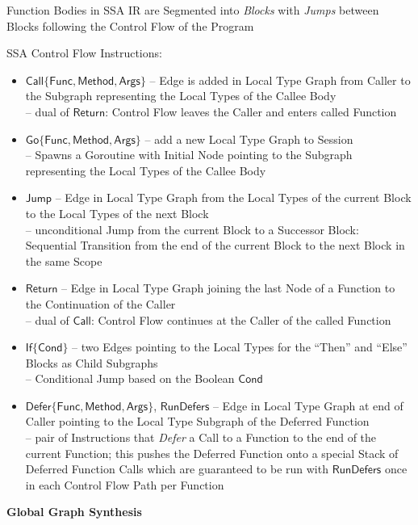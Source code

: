 Function Bodies in SSA IR are Segmented into \emph{Blocks} with
\emph{Jumps} between Blocks following the Control Flow of the Program

SSA Control Flow Instructions:
\begin{itemize}
  \item $\mathsf{Call\{Func, Method, Args\}}$ -- Edge is added in
    Local Type Graph from Caller to the Subgraph representing the
    Local Types of the Callee Body \\
    -- dual of $\mathsf{Return}$: Control Flow leaves the Caller and
    enters called Function
  \item $\mathsf{Go\{Func, Method, Args\}}$ -- add a new Local Type
    Graph to Session \\
    -- Spawns a Goroutine with Initial Node pointing to the Subgraph
    representing the Local Types of the Callee Body
  \item $\mathsf{Jump}$ -- Edge in Local Type Graph from the Local
    Types of the current Block to the Local Types of the next Block \\
    -- unconditional Jump from the current Block to a Successor Block:
    Sequential Transition from the end of the current Block to the
    next Block in the same Scope
  \item $\mathsf{Return}$ -- Edge in Local Type Graph joining the last
    Node of a Function to the Continuation of the Caller \\
    -- dual of $\mathsf{Call}$: Control Flow continues at the Caller
    of the called Function
  \item $\mathsf{If\{Cond\}}$ -- two Edges pointing to the Local Types
    for the ``Then'' and ``Else'' Blocks as Child Subgraphs\\
    -- Conditional Jump based on the Boolean $\mathsf{Cond}$
  \item $\mathsf{Defer\{Func, Method, Args\}}$, $\mathsf{RunDefers}$
    -- Edge in Local Type Graph at end of Caller pointing to the Local
    Type Subgraph of the Deferred Function \\
    -- pair of Instructions that \emph{Defer} a Call to a Function to
    the end of the current Function; this pushes the Deferred Function
    onto a special Stack of Deferred Function Calls which are
    guaranteed to be run with $\mathsf{RunDefers}$ once in each
    Control Flow Path per Function
\end{itemize}


\textbf{Global Graph Synthesis}

